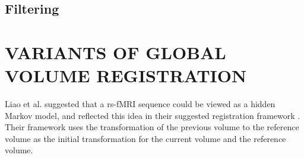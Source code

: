 \subsection{Filtering}


\section{VARIANTS OF GLOBAL VOLUME REGISTRATION}

Liao et al. suggested that a rs-fMRI sequence could be viewed as a hidden Markov model, and reflected this idea in their suggested registration framework \cite{Liao2016}. Their framework uses the transformation of the previous volume to the reference volume as the initial transformation for the current volume and the reference volume. 